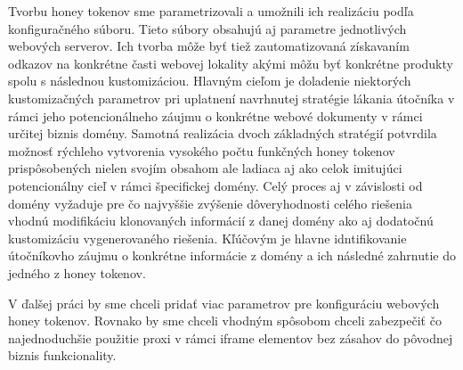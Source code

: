 \documentclass[conference, 11pt,slovak,a4paper,twoside]{IEEEtran}
\begin{document}
Tvorbu honey tokenov sme parametrizovali a umožnili ich realizáciu podľa konfiguračného súboru. Tieto súbory obsahujú aj parametre jednotlivých webových serverov. Ich tvorba môže byť tiež zautomatizovaná získavaním odkazov na konkrétne časti webovej lokality akými môžu byť konkrétne produkty spolu s následnou kustomizáciou. Hlavným cieľom je doladenie niektorých kustomizačných parametrov pri uplatnení navrhnutej stratégie lákania útočníka v rámci jeho potencionálneho záujmu o konkrétne webové dokumenty v rámci určitej biznis domény. Samotná realizácia dvoch základných stratégií potvrdila možnosť rýchleho vytvorenia vysokého počtu funkčných honey tokenov prispôsobených nielen svojím obsahom ale ladiaca aj ako celok imitujúci potencionálny cieľ v rámci špecifickej domény. Celý proces aj v závislosti od domény vyžaduje pre čo najvyššie zvýšenie dôveryhodnosti celého riešenia vhodnú modifikáciu klonovaných informácií z danej domény ako aj dodatočnú kustomizáciu vygenerovaného riešenia. Kľúčovým je hlavne idntifikovanie útočníkovho záujmu o konkrétne informácie z domény a ich následné zahrnutie do jedného z honey tokenov.

V ďalšej práci by sme chceli pridať viac parametrov pre konfiguráciu webových honey tokenov. Rovnako by sme chceli vhodným spôsobom chceli zabezpečiť čo najednoduchšie použitie proxi v rámci iframe elementov bez zásahov do pôvodnej biznis funkcionality. 


\end{document}
